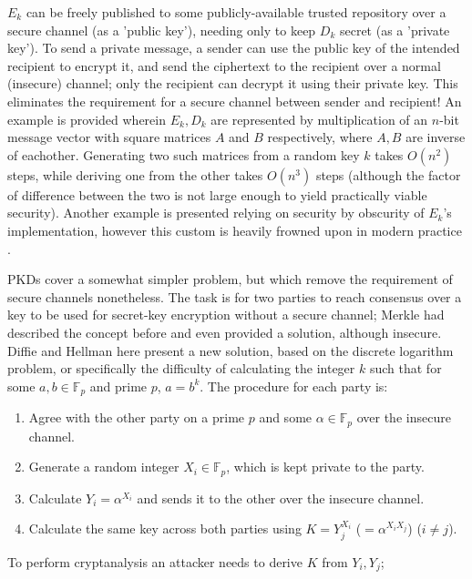\documentclass[11pt]{article}
\begin{document}
\( E_k \) can be freely published to some publicly-available trusted repository
over a secure channel (as a 'public key'), needing only to keep \( D_k \) secret
(as a 'private key'). To send a private message, a sender can use the public key
of the intended recipient to encrypt it, and send the ciphertext to the
recipient over a normal (insecure) channel; only the recipient can decrypt it
using their private key. This eliminates the requirement for a secure channel
between sender and recipient! An example is provided wherein \( E_k, D_k \) are
represented by multiplication of an \( n \)-bit message vector with square
matrices \( A \) and \( B \) respectively, where \( A, B \) are inverse of
eachother. Generating two such matrices from a random key \( k \) takes \(
O(n^2) \) steps, while deriving one from the other takes \( O(n^3) \) steps
(although the factor of difference between the two is not large enough to yield
practically viable security). Another example is presented relying on security
by obscurity of \( E_k \)'s implementation, however this custom is heavily
frowned upon in modern practice \cite{citkerckhoff}.
\par
PKDs cover a somewhat simpler problem, but which remove the requirement of
secure channels nonetheless. The task is for two parties to reach consensus over
a key to be used for secret-key encryption without a secure channel; Merkle had
described the concept before and even provided a solution, although insecure.
Diffie and Hellman here present a new solution, based on the discrete logarithm
problem, or specifically the difficulty of calculating the integer \( k \) such
that for some \( a, b \in \mathbb{F}_p \) and prime \( p \), \( a = b^k \). The
procedure for each party is:
\begin{enumerate}
    \item Agree with the other party on a prime \( p \) and some 
        \( \alpha \in \mathbb{F}_p \) over the insecure channel.
    \item Generate a random integer \( X_i \in \mathbb{F}_p \), which is kept
        private to the party.
    \item Calculate \( Y_i = \alpha{}^{X_i} \) and sends it to the other over
        the insecure channel.
    \item Calculate the same key across both parties using 
        \( K = Y_j^{X_i} \) (\( = \alpha{}^{X_iX_j} \)) (\( i \neq j \)).
\end{enumerate}
To perform cryptanalysis an attacker needs to derive \( K \) from \( Y_i,Y_j \);
\end{document}
